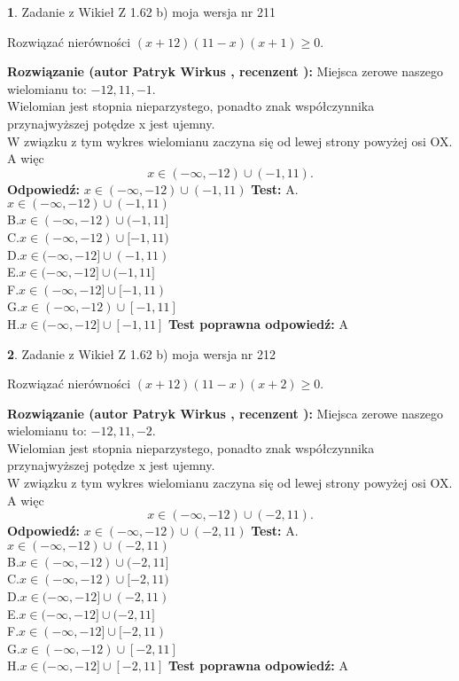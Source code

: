 \documentclass[12pt, a4paper]{article}
\theoremstyle{definition} %
\newtheorem{zad}{}
\newcommand{\zadStart}[1]{\begin{zad}#1\newline}
\newcommand{\zadStop}{\end{zad}}
\newcommand{\rozwStart}[2]{\noindent \textbf{Rozwiązanie (autor #1 , recenzent #2): }\newline}
\newcommand{\rozwStop}{\newline}
\newcommand{\odpStart}{\noindent \textbf{Odpowiedź:}\newline}
\newcommand{\odpStop}{\newline}
\newcommand{\testStart}{\noindent \textbf{Test:}\newline}
\newcommand{\testStop}{\newline}
\newcommand{\kluczStart}{\noindent \textbf{Test poprawna odpowiedź:}\newline}
\newcommand{\kluczStop}{\newline}
\begin{document}
\zadStart{Zadanie z Wikieł Z 1.62 b) moja wersja nr 211}

Rozwiązać nierówności $(x+12)(11-x)(x+1)\ge0$.
\zadStop
\rozwStart{Patryk Wirkus}{}
Miejsca zerowe naszego wielomianu to: $-12, 11, -1$.\\
Wielomian jest stopnia nieparzystego, ponadto znak współczynnika przy\linebreak najwyższej potędze x jest ujemny.\\ W związku z tym wykres wielomianu zaczyna się od lewej strony powyżej osi OX. A więc $$x \in (-\infty,-12) \cup (-1,11).$$
\rozwStop
\odpStart
$x \in (-\infty,-12) \cup (-1,11)$
\odpStop
\testStart
A.$x \in (-\infty,-12) \cup (-1,11)$\\
B.$x \in (-\infty,-12) \cup (-1,11]$\\
C.$x \in (-\infty,-12) \cup [-1,11)$\\
D.$x \in (-\infty,-12] \cup (-1,11)$\\
E.$x \in (-\infty,-12] \cup (-1,11]$\\
F.$x \in (-\infty,-12] \cup [-1,11)$\\
G.$x \in (-\infty,-12) \cup [-1,11]$\\
H.$x \in (-\infty,-12] \cup [-1,11]$
\testStop
\kluczStart
A
\kluczStop



\zadStart{Zadanie z Wikieł Z 1.62 b) moja wersja nr 212}

Rozwiązać nierówności $(x+12)(11-x)(x+2)\ge0$.
\zadStop
\rozwStart{Patryk Wirkus}{}
Miejsca zerowe naszego wielomianu to: $-12, 11, -2$.\\
Wielomian jest stopnia nieparzystego, ponadto znak współczynnika przy\linebreak najwyższej potędze x jest ujemny.\\ W związku z tym wykres wielomianu zaczyna się od lewej strony powyżej osi OX. A więc $$x \in (-\infty,-12) \cup (-2,11).$$
\rozwStop
\odpStart
$x \in (-\infty,-12) \cup (-2,11)$
\odpStop
\testStart
A.$x \in (-\infty,-12) \cup (-2,11)$\\
B.$x \in (-\infty,-12) \cup (-2,11]$\\
C.$x \in (-\infty,-12) \cup [-2,11)$\\
D.$x \in (-\infty,-12] \cup (-2,11)$\\
E.$x \in (-\infty,-12] \cup (-2,11]$\\
F.$x \in (-\infty,-12] \cup [-2,11)$\\
G.$x \in (-\infty,-12) \cup [-2,11]$\\
H.$x \in (-\infty,-12] \cup [-2,11]$
\testStop
\kluczStart
A
\kluczStop
\end{document}
